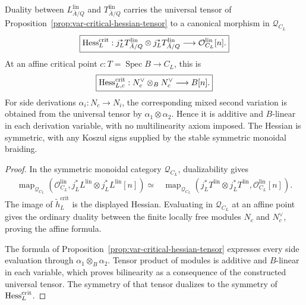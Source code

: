 \begin{theorem}
\label{thm:var-critical-hessian-bilinear}
Duality between \(L^{\mathrm{lin}}_{\bar A/Q}\) and \(T^{\mathrm{lin}}_{\bar A/Q}\) carries the universal tensor of Proposition~\ref{prop:var-critical-hessian-tensor} to a canonical morphism in \(\mathcal Q_{C_L}\)
\[
    \boxed{
    \operatorname{Hess}_L^{\mathrm{crit}}:
    j_L^*T^{\mathrm{lin}}_{\bar A/Q}
    \otimes
    j_L^*T^{\mathrm{lin}}_{\bar A/Q}
    \longrightarrow
    \mathcal O_{C_L}^{\mathrm{lin}}[n].
    }
\]
At an affine critical point \(c:T=\operatorname{Spec}B\to C_L\), this is
\[
    \boxed{
    \operatorname{Hess}_{L,c}^{\mathrm{crit}}:
    N_c^\vee\otimes_BN_c^\vee
    \longrightarrow
    B[n].
    }
\]
For side derivations \(\alpha_i:N_c\to N_i\), the corresponding mixed second variation is obtained from the universal tensor by \(\alpha_1\otimes\alpha_2\).  Hence it is additive and \(B\)-linear in each derivation variable, with no multilinearity axiom imposed.  The Hessian is symmetric, with any Koszul signs supplied by the stable symmetric monoidal braiding.
\end{theorem}

\begin{proof}
In the symmetric monoidal category \(\mathcal Q_{C_L}\), dualizability gives
\[
\begin{aligned}
    \operatorname{map}_{\mathcal Q_{C_L}}
    \left(
      \mathcal O_{C_L}^{\mathrm{lin}},
      j_L^*L^{\mathrm{lin}}
      \otimes
      j_L^*L^{\mathrm{lin}}[n]
    \right)
    \simeq{}&
    \operatorname{map}_{\mathcal Q_{C_L}}
    \left(
      j_L^*T^{\mathrm{lin}}
      \otimes
      j_L^*T^{\mathrm{lin}},
      \mathcal O_{C_L}^{\mathrm{lin}}[n]
    \right).
\end{aligned}
\]
The image of \(\widetilde h_L^{\mathrm{crit}}\) is the displayed Hessian.  Evaluating in \(\mathcal Q_{C_L}\) at an affine point gives the ordinary duality between the finite locally free modules \(N_c\) and \(N_c^\vee\), proving the affine formula.

The formula of Proposition~\ref{prop:var-critical-hessian-tensor} expresses every side evaluation through \(\alpha_1\otimes_B\alpha_2\).  Tensor product of modules is additive and \(B\)-linear in each variable, which proves bilinearity as a consequence of the constructed universal tensor.  The symmetry of that tensor dualizes to the symmetry of \(\operatorname{Hess}_L^{\mathrm{crit}}\).
\end{proof}


